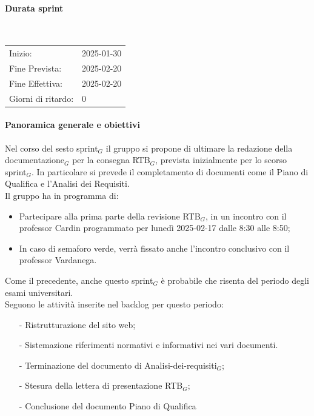 \documentclass[10pt]{article}
\begin{document}
{{{{{{    \paragraph{Durata sprint}\mbox{}\\
    \vspace{-1.5em}
    \begin{table}[h] 
    \renewcommand{\arraystretch}{1.2}  
    \begin{tabular}{ l l }
        Inizio: & 2025-01-30 \\
        Fine Prevista: & 2025-02-20 \\
        Fine Effettiva: & 2025-02-20 \\
        Giorni di ritardo: & 0 \\
    \end{tabular}
    \end{table}
    \vspace{-2em}
    {\renewcommand{\arraystretch}{1.5}%
    
    \paragraph{Panoramica generale e obiettivi}\mbox{}\vspace{0.4em}

    Nel corso del sesto sprint$_G$ il gruppo si propone di ultimare la redazione della documentazione$_G$ per la consegna RTB$_G$, prevista inizialmente per lo scorso sprint$_G$.
    In particolare si prevede il completamento di documenti come il Piano di Qualifica e l'Analisi dei Requisiti.
    \\
    Il gruppo ha in programma di:
    \begin{itemize}
        \item Partecipare alla prima parte della revisione RTB$_G$, in un incontro con il professor Cardin programmato per lunedì 2025-02-17 dalle 8:30 alle 8:50;
        \item In caso di semaforo verde, verrà fissato anche l'incontro conclusivo con il professor Vardanega.
    \end{itemize}
    Come il precedente, anche questo sprint$_G$ è probabile che risenta del periodo degli esami universitari.\\

    Seguono le attività inserite nel backlog per questo periodo:
    \vspace{-0.5em}
    \begin{itemize}
    \setlength\itemsep{-0.2em}
    \item [-] Ristrutturazione del sito web;
    \item [-] Sistemazione riferimenti normativi e informativi nei vari documenti.
    \item [-] Terminazione del documento di Analisi-dei-requisiti$_G$;
    \item [-] Stesura della lettera di presentazione RTB$_G$;
\item [-] Conclusione del documento Piano di Qualifica


\end{itemize}}}}}}}}
\end{document}
